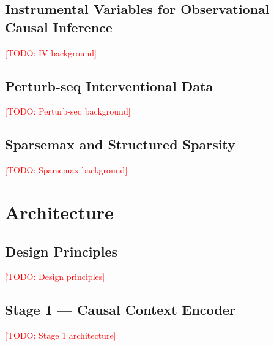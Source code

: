 \documentclass[11pt]{article}
\newcommand{\todo}[1]{\textcolor{red}{[TODO: #1]}}
\begin{document}
\subsection{Instrumental Variables for Observational Causal Inference}
\todo{IV background}

\subsection{Perturb-seq Interventional Data}
\todo{Perturb-seq background}

\subsection{Sparsemax and Structured Sparsity}
\todo{Sparsemax background}

\section{Architecture}

\subsection{Design Principles}
\todo{Design principles}

\subsection{Stage 1 — Causal Context Encoder}
\todo{Stage 1 architecture}
\end{document}
